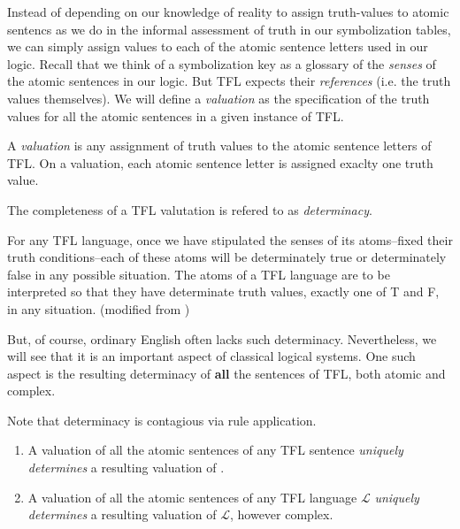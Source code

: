 Instead of depending on our knowledge of reality to assign truth-values to
atomic sentencs as we do in the informal assessment of truth in our
symbolization tables, we can simply assign values to each of the atomic
sentence letters used in our logic. Recall that we think of a symbolization
key as a glossary of the \emph{senses} of the atomic sentences in our logic. But
TFL expects their \emph{references} (i.e. the truth values themselves). We will
define a \emph{valuation} as the specification of the truth values for all the
atomic sentences in a given instance of TFL.

\begin{definition}[Valuation]
  \label{def:valuation}
  A \emph{valuation} is any assignment of truth values to the atomic sentence
  letters of TFL. On a valuation, each atomic sentence letter is assigned
  exaclty one truth value.
\end{definition}

The completeness of a TFL valutation is refered to as \emph{determinacy}.

\begin{definition}[Determinacy]
  For any TFL language, once we have stipulated the senses of its atoms--fixed
  their truth conditions--each of these atoms will be determinately true or
  determinately false in any possible situation. The atoms of a TFL language
  are to be interpreted so that they have determinate truth values, exactly
  one of T and F, in any situation. (modified from \cite[][p. 84-5]{Smi20})
\end{definition}

But, of course, ordinary English often lacks such determinacy. Nevertheless,
we will see that it is an important aspect of classical logical systems. One
such aspect is the resulting determinacy of \textbf{all} the sentences of TFL,
both atomic and complex.

\begin{observation}
  \label{obs:unique-determinacy}
  Note that determinacy is contagious via rule application.
  
  \begin{enumerate}
  \item A valuation of all the atomic sentences of any TFL sentence \ephi
    \emph{uniquely determines} a resulting valuation of \ephi.
  \item A valuation of all the atomic sentences of any TFL language
    $\mathcal{L}$ \emph{uniquely determines} a resulting valuation of
    $\mathcal{L}$, however complex.
  \end{enumerate}
  
\end{observation}

